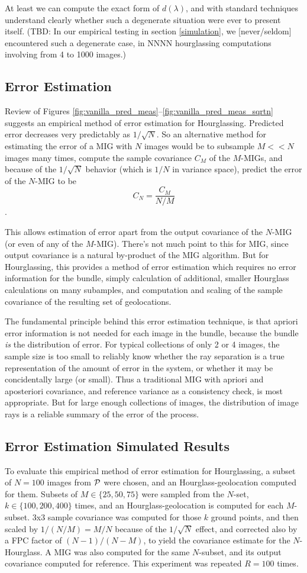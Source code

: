 \documentclass{amsart}
\begin{document}
At least we can compute the exact form of $d(\lambda)$, and with
standard techniques understand clearly whether such a degenerate
situation were ever to present itself. (TBD: In our empirical testing
in section \ref{simulation}, we [never/seldom] encountered such a
degenerate case, in NNNN hourglassing computations involving from 4 to
1000 images.)


\subsection{Error Estimation}
Review of Figures \ref{fig:vanilla_pred_meas}--\ref{fig:vanilla_pred_meas_sqrtn}
suggests an empirical method of error estimation for Hourglassing. Predicted
error decreases very predictably as $1/\sqrt N$. So an alternative method for
estimating the error of a MIG with $N$ images would be to subsample $M<<N$
images many times, compute the sample covariance $C_M$ of the $M$-MIGs, and
because of the $1/\sqrt N$ behavior (which is $1/N$ in variance space), predict
the error of the $N$-MIG to be $$C_N=\frac{C_M}{N/M}$$.

This allows estimation of error apart from the output covariance of the $N$-MIG
(or even of any of the $M$-MIG). There's not much point to this for MIG, since
output covariance is a natural by-product of the MIG algorithm. But for
Hourglassing, this provides a method of error estimation which requires no error
information for the bundle, simply calculation of additional, smaller Hourglass
calculations on many subamples, and computation and scaling of the sample
covariance of the resulting set of geolocations.

The fundamental principle behind this error estimation technique, is that
apriori error information is not needed for each image in the bundle, because
the bundle {\em is} the distribution of error. For typical collections of only 2
or 4 images, the sample size is too small to reliably know whether the ray
separation is a true representation of the amount of error in the system, or
whether it may be concidentally large (or small). Thus a traditional MIG with
apriori and aposteriori covariance, and reference variance as a consistency
check, is most appropriate. But for large enough collections of images, the
distribution of image rays is a reliable summary of the error of the process.

\subsection{Error Estimation Simulated Results}
To evaluate this empirical method of error estimation for Hourglassing, a subset
of $N=100$ images from $\mathcal{P}$ were chosen, and an Hourglass-geolocation
computed for them. Subsets of $M\in\{25,50,75\}$ were sampled from the $N$-set,
$k\in\{100,200,400\}$ times, and an Hourglass-geolocation is computed for each
$M$-subset. 3x3 sample covariance was computed for those $k$ ground points, and
then scaled by $1/(N/M)=M/N$ because of the $1/\sqrt{N}$ effect, and corrected
also by a FPC factor of $(N-1)/(N-M)$, to yield the covariance estimate for the
$N$-Hourglass. A MIG was also computed for the same $N$-subset, and its output
covariance computed for reference. This experiment was repeated $R=100$ times.
\end{document}
